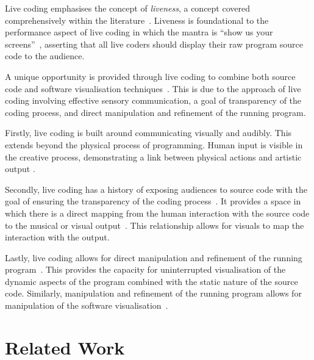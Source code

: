 Live coding emphasises the concept of \emph{liveness}, a concept covered comprehensively within the literature~\cite{Auslander,Masura2007}. Liveness is foundational to the performance aspect of live coding in which the mantra is ``show us your screens''~\cite{Toplap}, asserting that all live coders should display their raw program source code to the audience.

A unique opportunity is provided through live coding to combine both source code and software visualisation techniques~\cite{McLean2010a}. This is due to the approach of live coding involving effective sensory communication, a goal of transparency of the coding process, and direct manipulation and refinement of the running program.

Firstly, live coding is built around communicating visually and audibly. This extends beyond the physical process of programming. Human input is visible in the creative process, demonstrating a link between physical actions and artistic output \cite{Mclean}.

Secondly, live coding has a history of exposing audiences to source code with the goal of ensuring the transparency of the coding process~\cite{Collins2011,McLean2010a}. It provides a space in which there is a direct mapping from the human interaction with the source code to the musical or visual output~\cite{Mclean}. This relationship allows for visuals to map the interaction with the output.

Lastly, live coding allows for direct manipulation and refinement of the running program~\cite{Swift2013}. This provides the capacity for uninterrupted visualisation of the dynamic aspects of the program combined with the static nature of the source code. Similarly, manipulation and refinement of the running program allows for manipulation of the software visualisation~\cite{McLean2010a}.



\section{Related Work}


